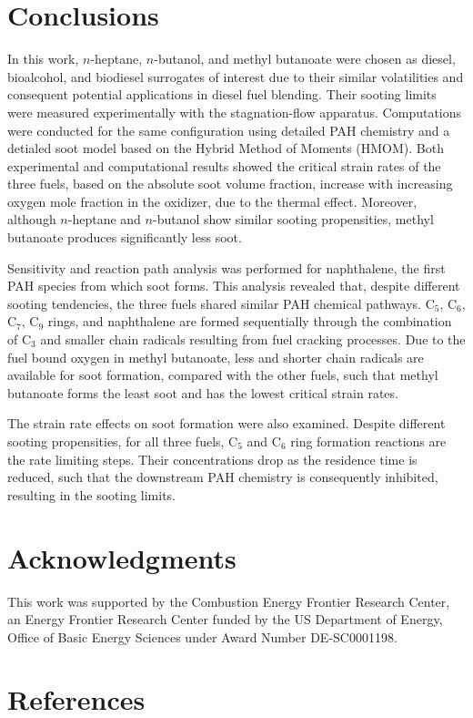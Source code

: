 \documentclass[review,3p,times]{elsarticleUS}
\begin{document}
\section{Conclusions}           

In this work, $n$-heptane, $n$-butanol, and methyl butanoate were chosen as diesel, bioalcohol, and biodiesel surrogates of interest due to their similar volatilities and consequent potential applications in diesel fuel blending. Their sooting limits were measured experimentally with the stagnation-flow apparatus. Computations were conducted for the same configuration using detailed PAH chemistry and a detialed soot model based on the Hybrid Method of Moments (HMOM). Both experimental and computational results showed the critical strain rates of the three fuels, based on the absolute soot volume fraction, increase with increasing oxygen mole fraction in the oxidizer, due to the thermal effect. Moreover, although $n$-heptane and $n$-butanol show similar sooting propensities, methyl butanoate produces significantly less soot.

Sensitivity and reaction path analysis was performed for naphthalene, the first PAH species from which soot forms. This analysis revealed that, despite different sooting tendencies, the three fuels shared similar PAH chemical pathways. C$_5$, C$_6$, C$_7$, C$_9$ rings, and naphthalene are formed sequentially through the combination of C$_3$ and smaller chain radicals resulting from fuel cracking processes. Due to the fuel bound oxygen in methyl butanoate, less and shorter chain radicals are available for soot formation, compared with the other fuels, such that methyl butanoate forms the least soot and has the lowest critical strain rates.

The strain rate effects on soot formation were also examined. Despite different sooting propensities, for all three fuels, C$_5$ and C$_6$ ring formation reactions are the rate limiting steps. Their concentrations drop as the residence time is reduced, such that the downstream PAH chemistry is consequently inhibited, resulting in the sooting limits.


\section*{Acknowledgments}
This work was supported by the Combustion Energy Frontier Research Center, an Energy Frontier Research Center funded by the US Department of Energy, Office of Basic Energy Sciences under Award Number DE-SC0001198.

\section*{References}




\renewcommand{\thefigure}{\arabic{figure}}
\renewcommand{\thetable}{\arabic{table}}
\end{document}
